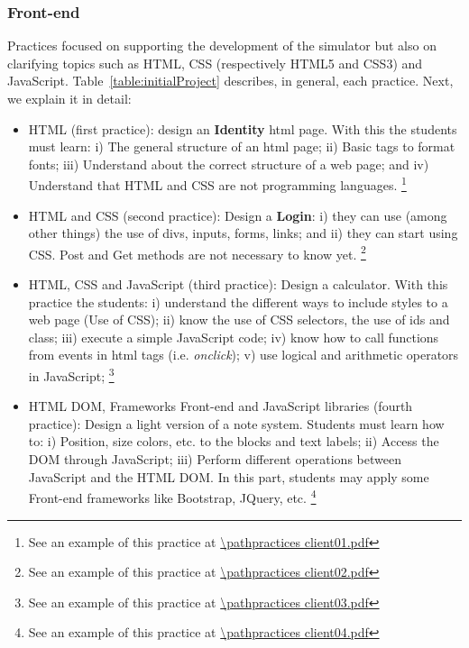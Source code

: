 \subsubsection{Front-end}
Practices focused on supporting the development of the simulator but also on clarifying topics 
such as HTML, CSS (respectively HTML5 and CSS3) and JavaScript. 
Table~\ref{table:initialProject} describes, in general, each practice. 
Next, we explain it in detail:
\begin{itemize}
    \item HTML (first practice): design an \textbf{Identity} html page. 
        With this the students must learn: 
        i) The general structure of an html page;
        ii) Basic tags to format fonts;
        iii) Understand about the correct structure of a web page; and
        iv) Understand that HTML and CSS are not programming languages.
        \footnote{See an example of this practice at \url{\pathpractices client01.pdf}}
    \item HTML and CSS (second practice): Design a \textbf{Login}:
        i) they can use (among other things) the use of divs, inputs, forms, links; and
        ii) they can start using CSS. Post and Get methods are not necessary to know yet.
        \footnote{See an example of this practice at \url{\pathpractices client02.pdf}}
    \item HTML, CSS and JavaScript (third practice): Design a calculator. With this practice the 
        students:
        i) understand the different ways to include styles to a web page (Use of CSS);
        ii) know the use of CSS selectors, the use of ids and class;
        iii) execute a simple JavaScript code;
        iv) know how to call functions from events in html tags (i.e. \textit{onclick});
        v) use logical and arithmetic operators in JavaScript;
        \footnote{See an example of this practice at \url{\pathpractices client03.pdf}}
    \item HTML DOM, Frameworks Front-end and JavaScript libraries (fourth practice): 
        Design a light version of a note system. Students must learn how to:
        i) Position, size colors, etc. to the blocks and text labels;
        ii) Access the DOM through JavaScript;
        iii) Perform different operations between JavaScript and the HTML DOM.
        In this part, students may apply some Front-end frameworks like Bootstrap, JQuery,
        etc.
        \footnote{See an example of this practice at \url{\pathpractices client04.pdf}}
\end{itemize}

